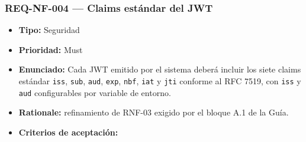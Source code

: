 \documentclass[
  spanish,
]{article}
\providecommand{\tightlist}{%
  \setlength{\itemsep}{0pt}\setlength{\parskip}{0pt}}
\begin{document}
\subsubsection{REQ-NF-004 --- Claims estándar del
JWT}\label{req-nf-004-claims-estuxe1ndar-del-jwt}

\begin{itemize}
\tightlist
\item
  \textbf{Tipo:} Seguridad
\item
  \textbf{Prioridad:} Must
\item
  \textbf{Enunciado:} Cada JWT emitido por el sistema deberá incluir los
  siete claims estándar \texttt{iss}, \texttt{sub}, \texttt{aud},
  \texttt{exp}, \texttt{nbf}, \texttt{iat} y \texttt{jti} conforme al
  RFC 7519, con \texttt{iss} y \texttt{aud} configurables por variable
  de entorno.
\item
  \textbf{Rationale:} refinamiento de RNF-03 exigido por el bloque A.1
  de la Guía.
\item
  \textbf{Criterios de aceptación:}


\end{itemize}
\end{document}
